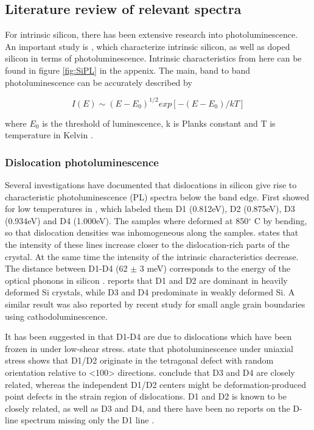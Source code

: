 \subsection{Literature review of relevant spectra}

For intrinsic silicon, there has been extensive research into photoluminescence. An important study is \cite{dean67}, which characterize intrinsic silicon, as well as doped silicon in terms of photoluminescence. Intrinsic characteristics from here can be found in figure \ref{fig:SiPL} in the appenix. The main, band to band photoluminescence can be accurately described by 

\begin{equation}
I(E)\sim(E-E_0)^{1/2}exp[-(E-E_0)/kT]
\label{eq:to_line}
\end{equation}

where $E_0$ is the threshold of luminescence, k is Planks constant and T is temperature in Kelvin \cite{davies88}.

\subsubsection{Dislocation photoluminescence}

Several investigations have documented that dislocations in silicon give rise to characteristic photoluminescence (PL) spectra below the band edge. First showed for low temperatures in \cite{drozdov76}, which labeled them D1 (0.812eV), D2 (0.875eV), D3 (0.934eV) and D4 (1.000eV). The samples where deformed at 850$^\circ$ C by bending, so that dislocation densities was inhomogeneous along the samples. \cite{drozdov76} states that the intensity of these lines increase closer to the dislocation-rich parts of the crystal. At the same time the intensity of the intrinsic characteristics decrease. The distance between D1-D4 (62 $\pm$ 3 meV) corresponds to the energy of the optical phonons in silicon \cite{drozdov76}. \cite{drozdov76} reports that D1 and D2 are dominant in heavily deformed Si crystals, while D3 and D4 predominate in weakly deformed Si. A similar result was also reported by recent study \cite{lee09} for small angle grain boundaries using cathodoluminescence.

It has been suggested in \cite{sauer85} that D1-D4 are due to dislocations which have been frozen in under low-shear stress. \cite{sauer85} state that photoluminescence under uniaxial stress shows that D1/D2 originate in the tetragonal defect with random orientation relative to <100> directions. \cite{sauer85} conclude that D3 and D4 are closely related, whereas the independent D1/D2 centers might be deformation-produced point defects in the strain region of dislocations. D1 and D2 is known to be closely related, as well as D3 and D4, and there have been no reports on the D-line spectrum missing only the D1 line \cite{sugimoto06}.


